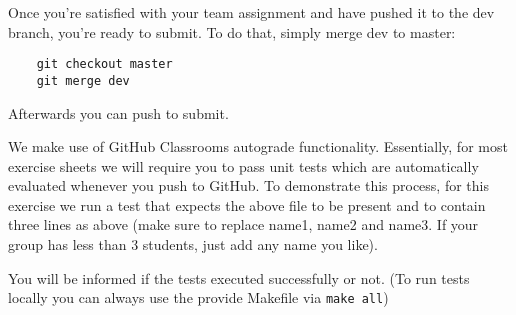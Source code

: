 \documentclass{exam}
\begin{document}
\begin{questions}
	Once you're satisfied with your team assignment and have pushed it to the dev branch, you're ready to submit. To do that, simply merge dev to master:
	\begin{verbatim}
	git checkout master
	git merge dev
	\end{verbatim}
	
	Afterwards you can push to submit.
	
	We make use of GitHub Classrooms autograde functionality. Essentially, for most exercise sheets we will require you to pass unit tests which are automatically evaluated whenever you push to GitHub.
	To demonstrate this process, for this exercise we run a test that expects the above file to be present and to contain three lines as above (make sure to replace name1, name2 and name3. If your group has less than 3 students, just add any name you like).

	You will be informed if the tests executed successfully or not.
	(To run tests locally you can always use the provide Makefile via \texttt{make all})
\end{questions}
\end{document}
